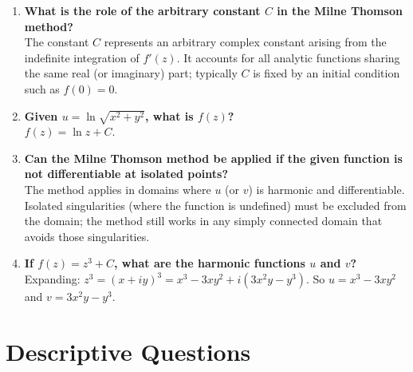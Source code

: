 \documentclass[12pt,a4paper]{article}
\begin{document}
\begin{enumerate}
  \item \textbf{What is the role of the arbitrary constant \( C \) in the Milne Thomson method?}\\
  The constant \( C \) represents an arbitrary complex constant arising from the indefinite integration of \( f'(z) \). It accounts for all analytic functions sharing the same real (or imaginary) part; typically \( C \) is fixed by an initial condition such as \( f(0) = 0 \).

  \item \textbf{Given \( u = \ln\sqrt{x^2+y^2} \), what is \( f(z) \)?}\\
  \( f(z) = \ln z + C \).

  \item \textbf{Can the Milne Thomson method be applied if the given function is not differentiable at isolated points?}\\
  The method applies in domains where \( u \) (or \( v \)) is harmonic and differentiable. Isolated singularities (where the function is undefined) must be excluded from the domain; the method still works in any simply connected domain that avoids those singularities.

  \item \textbf{If \( f(z) = z^3 + C \), what are the harmonic functions \( u \) and \( v \)?}\\
  Expanding: \( z^3 = (x+iy)^3 = x^3 - 3xy^2 + i(3x^2y - y^3) \). So \( u = x^3 - 3xy^2 \) and \( v = 3x^2y - y^3 \).
\end{enumerate}

\section{Descriptive Questions}
\end{document}
